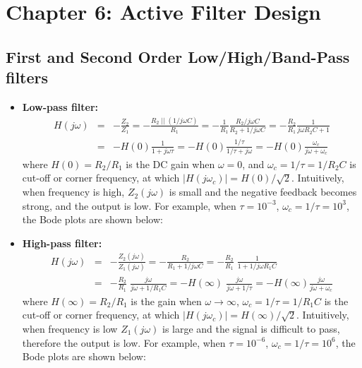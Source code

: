 \usepackage{html}


\section*{Chapter 6: Active Filter Design}

\subsection{First and Second Order Low/High/Band-Pass filters}


\begin{itemize}
\item {\bf Low-pass filter:}
  \begin{eqnarray}
    H(j\omega)&=&-\frac{Z_2}{Z_1}=-\frac{R_2\;||\;(1/j\omega C)}{R_1}
    =-\frac{1}{R_1}\frac{R_2/j\omega C}{R_2+1/j\omega C}
    =-\frac{R_2}{R_1}\frac{1}{j\omega R_2C+1}
    \nonumber \\
    &=&-H(0)\frac{1}{1+j\omega \tau}=-H(0)\frac{1/\tau}{1/\tau+j\omega} 
    =-H(0)\frac{\omega_c}{j\omega+\omega_c} 
    \nonumber
  \end{eqnarray}
  where $H(0)=R_2/R_1$ is the DC gain when $\omega=0$, and
  $\omega_c=1/\tau=1/R_2C$ is cut-off or corner frequency, at which 
  $|H(j\omega_c)|=H(0)/\sqrt{2}$. Intuitively, when frequency is high, 
  $Z_2(j\omega)$ is small and the negative feedback becomes strong,
  and the output is low. For example, when
  $\tau=10^{-3}$, $\omega_c=1/\tau=10^3$, the Bode plots are shown  
  below:


\item {\bf High-pass filter:}
  \begin{eqnarray}
    H(j\omega)&=&-\frac{Z_2(j\omega)}{Z_1(j\omega)}
    =-\frac{R_2}{R_1+1/j\omega C}
    =-\frac{R_2}{R_1}\;\frac{1}{1+1/j\omega R_1C}
    \nonumber \\
    &=&-\frac{R_2}{R_1}\;\frac{j\omega}{j\omega +1/R_1C}
    =-H(\infty)\;\frac{j\omega}{j\omega+1/\tau} 
    =-H(\infty)\frac{j\omega}{j\omega+\omega_c} 
    \nonumber
  \end{eqnarray}
  where $H(\infty)=R_2/R_1$ is the gain when $\omega\rightarrow\infty$, 
  $\omega_c=1/\tau=1/R_1C$ is the cut-off or corner frequency, at which
  $|H(j\omega_c)|=H(\infty)/\sqrt{2}$. Intuitively, when frequency is 
  low $Z_1(j\omega)$ is large and the signal is difficult to pass, 
  therefore the output is low. For example, when $\tau=10^{-6}$, 
  $\omega_c=1/\tau=10^6$, the Bode plots are shown below:
  

\end{itemize}
